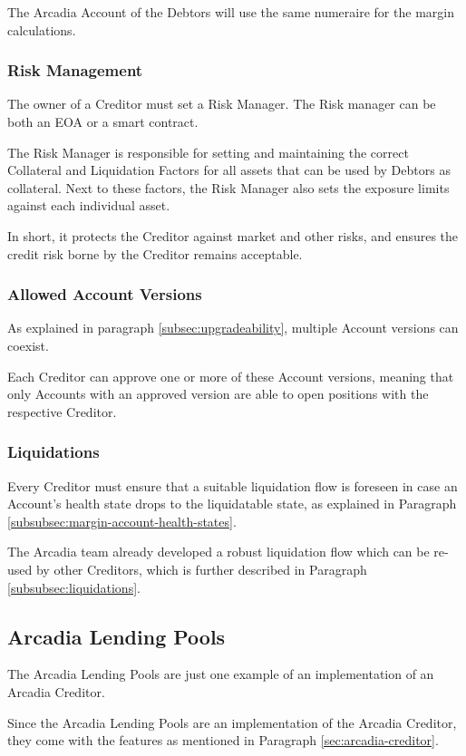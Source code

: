 \documentclass[sigconf,nonacm]{acmart}
\begin{document}
The Arcadia Account of the Debtors will use the same numeraire for the margin calculations.

\subsubsection{Risk Management}
The owner of a Creditor must set a Risk Manager.
The Risk manager can be both an EOA or a smart contract.

The Risk Manager is responsible for setting and maintaining the correct Collateral and Liquidation Factors for all assets that can be used by Debtors as collateral.
Next to these factors, the Risk Manager also sets the exposure limits against each individual asset. 

In short, it protects the Creditor against market and other risks, and ensures the credit risk borne by the Creditor remains acceptable.

\subsubsection{Allowed Account Versions}
As explained in paragraph \ref{subsec:upgradeability}, multiple Account versions can coexist.

Each Creditor can approve one or more of these Account versions,
meaning that only Accounts with an approved version are able to open positions with the respective Creditor.

\subsubsection{Liquidations}
Every Creditor must ensure that a suitable liquidation flow is foreseen in case an Account's health state drops to the liquidatable state,
as explained in Paragraph \ref{subsubsec:margin-account-health-states}.

The Arcadia team already developed a robust liquidation flow which can be re-used by other Creditors,
which is further described in Paragraph \ref{subsubsec:liquidations}.

\subsection{Arcadia Lending Pools}
The Arcadia Lending Pools are just one example of an implementation of an Arcadia Creditor.

Since the Arcadia Lending Pools are an implementation of the Arcadia Creditor,
they come with the features as mentioned in Paragraph \ref{sec:arcadia-creditor}.
\end{document}
